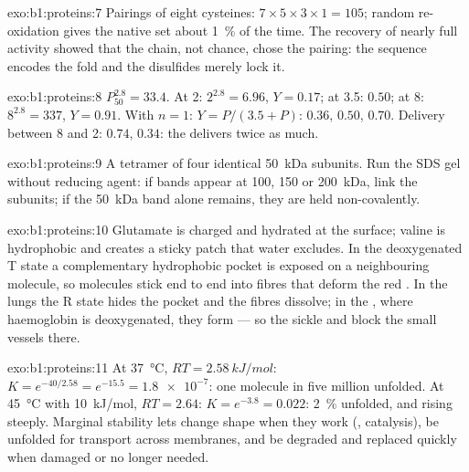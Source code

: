 \begin{solution}{exo:b1:proteins:7}
Pairings of eight cysteines: $7\times 5\times 3\times 1 = 105$; random
re-oxidation gives the native set about \qty{1}{\%} of the time. The
recovery of nearly full activity showed that the chain, not chance,
chose the pairing: the sequence encodes the fold and the disulfides
merely lock it.
\end{solution}

\begin{solution}{exo:b1:proteins:8}
$P_{50}^{2.8} = 33.4$. At 2: $2^{2.8} = 6.96$, $Y = 0.17$; at 3.5:
$0.50$; at 8: $8^{2.8} = 337$, $Y = 0.91$. With $n = 1$: $Y =
P/(3.5 + P)$: $0.36$, $0.50$, $0.70$. Delivery between 8 and 2:
 $0.74$,  $0.34$: the  
delivers twice as much.
\end{solution}

\begin{solution}{exo:b1:proteins:9}
A tetramer of four identical \qty{50}{kDa} subunits. Run the SDS gel
without reducing agent: if bands appear at 100, 150 or \qty{200}{kDa},
 link the subunits; if the \qty{50}{kDa} band alone
remains, they are held non-covalently.
\end{solution}

\begin{solution}{exo:b1:proteins:10}
Glutamate is charged and hydrated at the surface; valine is
hydrophobic and creates a sticky patch that water excludes. In the
deoxygenated T state a complementary hydrophobic pocket is exposed on
a neighbouring molecule, so molecules stick end to end into fibres
that deform the red . In the lungs the R state hides the pocket
and the fibres dissolve; in the , where haemoglobin is
deoxygenated, they form --- so the  sickle and block the small
vessels there.
\end{solution}

\begin{solution}{exo:b1:proteins:11}
At \qty{37}{\celsius}, $RT = \qty{2.58}{kJ/mol}$: $K = e^{-40/2.58} =
e^{-15.5} = \num{1.8e-7}$: one molecule in five million unfolded. At
\qty{45}{\celsius} with \qty{10}{kJ/mol}, $RT = 2.64$: $K = e^{-3.8} =
0.022$: \qty{2}{\%} unfolded, and rising steeply. Marginal stability
lets  change shape when they work (, catalysis), be
unfolded for transport across membranes, and be degraded and replaced
quickly when damaged or no longer needed.
\end{solution}

